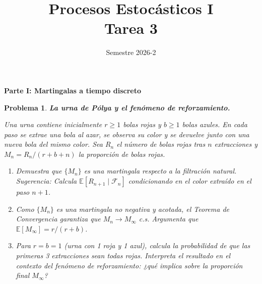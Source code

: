 \documentclass[12pt]{article}
\title{Procesos Estocásticos I \\ Tarea 3}
\author{Semestre 2026-2}
\date{}
\newtheorem{problem}{Problema}
\begin{document}
\maketitle


\noindent\textbf{\large Parte I: Martingalas a tiempo discreto}

\bigskip

\begin{problem}
\textbf{La urna de Pólya y el fenómeno de reforzamiento.}

Una urna contiene inicialmente $r \ge 1$ bolas rojas y $b \ge 1$ bolas azules. En cada paso se extrae una bola al azar, se observa su color y se devuelve junto con una nueva bola del mismo color. Sea $R_n$ el número de bolas rojas tras $n$ extracciones y $M_n = R_n / (r + b + n)$ la proporción de bolas rojas.

\begin{enumerate}
    \item[(a)] Demuestra que $\{M_n\}$ es una martingala respecto a la filtración natural. \textit{Sugerencia:} Calcula $\mathbb{E}[R_{n+1} \mid \mathcal{F}_n]$ condicionando en el color extraído en el paso $n+1$.

    \item[(b)] Como $\{M_n\}$ es una martingala no negativa y acotada, el Teorema de Convergencia garantiza que $M_n \to M_\infty$ c.s. Argumenta que $\mathbb{E}[M_\infty] = r/(r+b)$.

    \item[(c)] Para $r = b = 1$ (urna con 1 roja y 1 azul), calcula la probabilidad de que las primeras 3 extracciones sean todas rojas. Interpreta el resultado en el contexto del \emph{fenómeno de reforzamiento}: ¿qué implica sobre la proporción final $M_\infty$?
\end{enumerate}
\end{problem}
\end{document}
